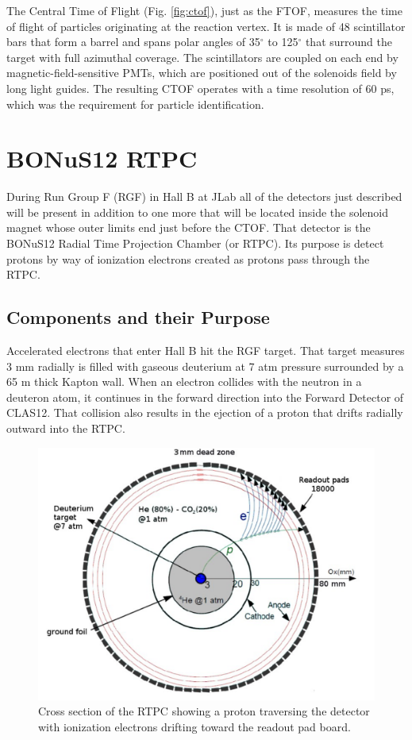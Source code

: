 The Central Time of Flight (Fig. \ref{fig:ctof}), just as the FTOF, measures the time of flight of particles originating at the reaction vertex. It is made of 48 scintillator bars that form a barrel and spans polar angles of 35$^{\circ}$ to 125$^{\circ}$ that surround the target with full azimuthal coverage. The scintillators are coupled on each end by magnetic-field-sensitive PMTs, which are positioned out of the solenoids field by long light guides. The resulting CTOF operates with a time resolution of 60 ps, which was the requirement for particle identification.

\section{BONuS12 RTPC}
During Run Group F (RGF) in Hall B at JLab all of the detectors just described will be present in addition to one more that will be located inside the solenoid magnet whose outer limits end just before the CTOF. That detector is the BONuS12 Radial Time Projection Chamber (or RTPC). Its purpose is detect protons by way of ionization electrons created as protons pass through the RTPC.

\subsection{Components and their Purpose}
Accelerated electrons that enter Hall B hit the RGF target. That target measures 3 mm radially is filled with gaseous deuterium at 7 atm pressure surrounded by a 65 \textmu m thick Kapton wall. When an electron collides with the neutron in a deuteron atom, it continues in the forward direction into the Forward Detector of CLAS12. That collision also results in the ejection of a proton that drifts radially outward into the RTPC.

\begin{figure}[h!]
	\centering
	\includegraphics[width=0.8\linewidth]{figures/rtpc_op.png}
	\caption{Cross section of the RTPC showing a proton traversing the detector with ionization electrons drifting toward the readout pad board.}
	\label{fig:rtpc_op}
\end{figure}

